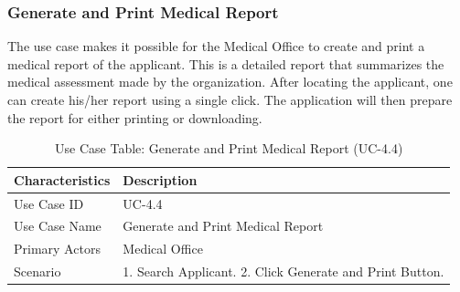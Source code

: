\subsubsection{Generate and Print Medical Report}
The use case makes it possible for the Medical Office to create and print a medical report of the applicant. This is a detailed report that summarizes the medical assessment made by the organization. After locating the applicant, one can create his/her report using a single click. The application will then prepare the report for either printing or downloading.
\begin{table}[H]
    \centering
    \small
    \renewcommand{\arraystretch}{1.4}
    \caption{Use Case Table: Generate and Print Medical Report (UC-4.4)} %
    \label{tab:generate-print-medical}
    \begin{tabularx}{\textwidth}{|l|X|}
        \hline
        \rowcolor[gray]{0.9} {Characteristics} & {Description} \\ \hline
        Use Case ID & UC-4.4 \\ \hline
        Use Case Name & Generate and Print Medical Report \\ \hline
        Primary Actors & Medical Office \\ \hline
        Scenario & 1. Search Applicant. 2. Click Generate and Print Button. \\ \hline
    \end{tabularx}
\end{table}
\FloatBarrier